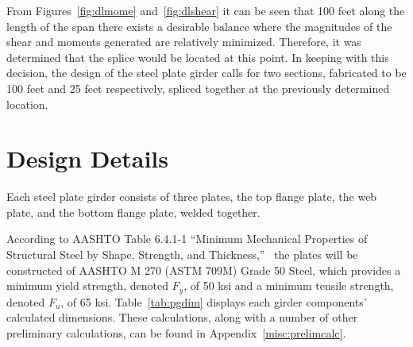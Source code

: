 From Figures~\ref{fig:dlmome} and~\ref{fig:dlshear} it can be seen that 100 feet along the length of the span there exists a desirable balance where the magnitudes of the shear and moments generated are relatively minimized. Therefore, it was determined that the splice would be located at this point. In keeping with this decision, the design of the steel plate girder calls for two sections, fabricated to be 100 feet and 25 feet respectively, spliced together at the previously determined location.

\section{Design Details}
Each steel plate girder consists of three plates, the top flange plate, the web plate, and the bottom flange plate, welded together.

According to AASHTO Table 6.4.1-1 ``Minimum Mechanical Properties of Structural Steel by Shape, Strength, and Thickness,''~\cite{aashto7} the plates will be constructed of AASHTO M 270 (ASTM 709M) Grade 50 Steel, which provides a minimum yield strength, denoted \(F_{y}\), of 50 ksi and a minimum tensile strength, denoted \(F_{u}\), of 65 ksi. Table~\ref{tab:pgdim} displays each girder components' calculated dimensions. These calculations, along with a number of other preliminary calculations, can be found in Appendix~\ref{misc:prelimcalc}.

\begin{table}[H]
\begin{center}
\caption{Plate Girder Components Dimensions}\label{tab:pgdim}
\vspace{0.5cm}
\end{center}
\end{table}

